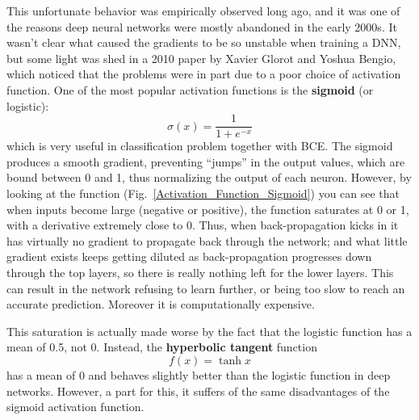 This unfortunate behavior was empirically observed long ago, and it was one of the reasons deep neural networks were mostly abandoned in the early 2000s. It wasn't clear what caused the gradients to be so unstable when training a DNN, but some light was shed in a 2010 paper by Xavier Glorot and Yoshua Bengio, which noticed that the problems were in part due to a poor choice of activation function. One of the most popular activation functions is the \textbf{sigmoid} (or logistic):
\begin{equation}
\sigma(x)=\frac{1}{1+e^{-x}}
\end{equation}
which is very useful in classification problem together with BCE. The sigmoid produces a smooth gradient, preventing ``jumps'' in the output values, which are bound between 0 and 1, thus normalizing the output of each neuron. However, by looking at the function (Fig.~\ref{Activation_Function_Sigmoid}) you can see that when inputs become large (negative or positive), the function saturates at 0 or 1, with a derivative extremely close to 0. Thus, when back-propagation kicks in it has virtually no gradient to propagate back through the network; and what little gradient exists keeps getting diluted as back-propagation progresses down through the top layers, so there is really nothing left for the lower layers. This can result in the network refusing to learn further, or being too slow to reach an accurate prediction. Moreover it is computationally expensive.

This saturation is actually made worse by the fact that the logistic function has a mean of 0.5, not 0. Instead, the \textbf{hyperbolic tangent} function
\begin{equation}
f(x)=\tanh{x}
\end{equation}
has a mean of 0 and behaves slightly better than the logistic function in deep networks. However, a part for this, it suffers of the same disadvantages of the sigmoid activation function.

